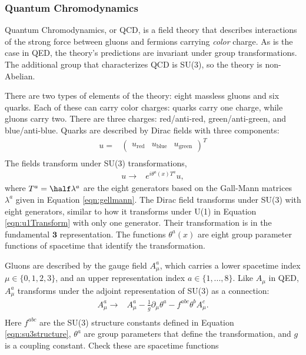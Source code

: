 \subsubsection{Quantum Chromodynamics}
Quantum Chromodynamics, or QCD, is a field theory that describes interactions of the strong force between gluons and fermions carrying \emph{color} charge.
As is the case in QED, the theory's predictions are invariant under \poincare group transformations.
The additional group that characterizes QCD is SU(3), so the theory is non-Abelian.

There are two types of elements of the theory: eight massless gluons and six quarks.
Each of these can carry color charges: quarks carry one charge, while gluons carry two.
There are three charges: red/anti-red, green/anti-green, and blue/anti-blue.
Quarks are described by Dirac fields with three components:
\begin{equation}\begin{split}
    u=&\begin{pmatrix}u_\text{red}&u_\text{blue}&u_\text{green}\end{pmatrix}^T \\
\end{split}\end{equation} 
The fields transform under SU(3) transformations,
\begin{equation}\begin{split}
    u\to&e^{i\theta^a(x)T^a}u,
\end{split}\end{equation} 
where $T^a=\half\lambda^a$ are the eight generators based on the Gall-Mann matrices $\lambda^a$ given in Equation \ref{eqn:gellmann}.
The Dirac field transforms under SU(3) with eight generators, similar to how it transforms under U(1) in Equation \ref{eqn:u1Transform} with only one generator.
Their transformation is in the fundamental $\pmb3$ representation.
The functions $\theta^a(x)$ are eight group parameter functions of spacetime that identify the transformation.

Gluons are described by the gauge field $A_\mu^a$, which carries a lower spacetime index $\mu\in\{0,1,2,3\}$, and an upper representation index $a\in\{1,...,8\}$.
Like $A_\mu$ in QED, $A_\mu^a$ transforms under the adjoint representation of SU(3) as a connection:
\begin{equation}\begin{split}
    A_\mu^a\to&A_\mu^a-\frac{1}{g}\partial_\mu\theta^a-f^{abc}\theta^bA^c_\mu. \\
\end{split}\end{equation} 
Here $f^{abc}$ are the SU(3) structure constants defined in Equation \ref{eqn:su3structure}, $\theta^a$ are group parameters that define the transformation, and $g$ is a coupling constant. {\color{red} Check these are spacetime functions}

